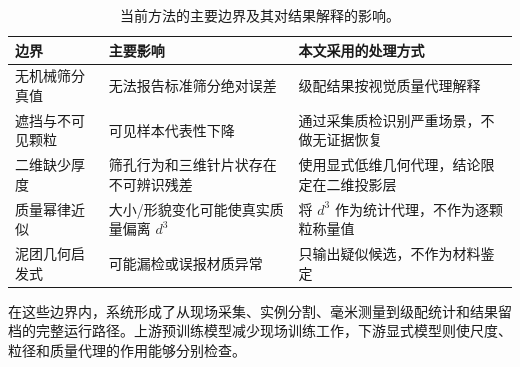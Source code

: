 \begin{table}[H]
\centering
\caption{当前方法的主要边界及其对结果解释的影响。}
\label{tab:r-limits}
\footnotesize
\renewcommand{\arraystretch}{1.1}
\begin{tabular}{>{\raggedright\arraybackslash}p{2.7cm}>{\raggedright\arraybackslash}p{5.7cm}>{\raggedright\arraybackslash}p{7.0cm}}
\toprule
边界 & 主要影响 & 本文采用的处理方式 \\
\midrule
无机械筛分真值 & 无法报告标准筛分绝对误差 & 级配结果按视觉质量代理解释 \\
遮挡与不可见颗粒 & 可见样本代表性下降 & 通过采集质检识别严重场景，不做无证据恢复 \\
二维缺少厚度 & 筛孔行为和三维针片状存在不可辨识残差 & 使用显式低维几何代理，结论限定在二维投影层 \\
质量幂律近似 & 大小/形貌变化可能使真实质量偏离 $d^3$ & 将 $d^3$ 作为统计代理，不作为逐颗粒称量值 \\
泥团几何启发式 & 可能漏检或误报材质异常 & 只输出疑似候选，不作为材料鉴定 \\
\bottomrule
\end{tabular}
\end{table}

在这些边界内，系统形成了从现场采集、实例分割、毫米测量到级配统计和结果留档的完整运行路径。上游预训练模型减少现场训练工作，下游显式模型则使尺度、粒径和质量代理的作用能够分别检查。
